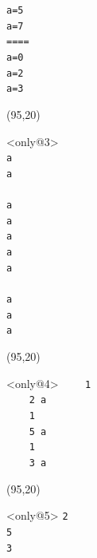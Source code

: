 \documentclass{beamer}
\begin{document}
\begin{frame}[fragile,t]
\begin{textblock}{25}
\begin{block}
    \verb;a=5             ;\\
    \verb;a=7             ;\\
    \verb;====            ;\\
    \verb;a=0             ;\\
    \verb;a=2             ;\\
    \verb;a=3             ;\\
    \vspace*{0.5ex}
    \end{block}
    \end{textblock}
    \begin{textblock}{25}(95,20)
     \vspace{-0.5cm}
    \begin{block}<only@3>{\vspace*{-3ex}}
    \scriptsize
    \verb; ;\\
    \verb;a;\\
    \verb;a;\\
    \verb; ;\\
    \verb;a;\\
    \verb;a;\\
    \verb;a;\\
    \verb;a;\\
    \verb;a;\\
    \verb; ;\\
    \verb;a;\\
    \verb;a;\\
    \verb;a;\\
    \vspace*{0.5ex}
    \end{block}
    \end{textblock}
    \begin{textblock}{25}(95,20)
     \vspace{-0.5cm}
    \begin{block}<only@4>{\vspace*{-3ex}}
    \scriptsize
    \verb;    1  ;\\
    \verb;    2 a;\\
    \verb;    1  ;\\
    \verb;    5 a;\\
    \verb;    1  ;\\
    \verb;    3 a;\\
    \vspace*{0.5ex}
    \end{block}
    \end{textblock}
    \begin{textblock}{25}(95,20)
     \vspace{-0.5cm}
    \begin{block}<only@5>{\vspace*{-3ex}}
    \scriptsize
    \verb;2;\\
    \verb;5;\\
    \verb;3;\\
    \vspace*{0.5ex}
    \end{block}
    \end{textblock}
\end{frame}
\end{document}
